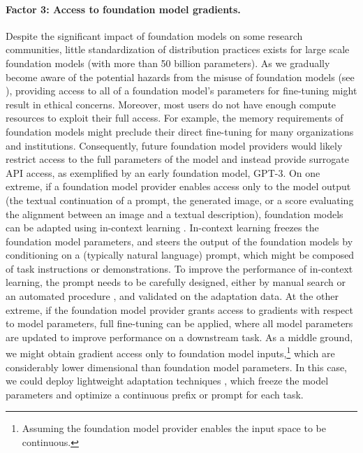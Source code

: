 \noindent\paragraph{Factor 3: Access to foundation model gradients.} 
Despite the significant impact of foundation models on some research communities, 
little standardization of distribution practices exists for large scale foundation models (with more than 50 billion parameters). 
As we gradually become aware of the potential hazards from the misuse of foundation models (see ), providing access to all of a foundation model's parameters for fine-tuning might result in ethical concerns. Moreover, most users do not have enough compute resources to exploit their full access. For example, the memory requirements of foundation models might preclude their direct fine-tuning for many organizations and institutions. Consequently, future foundation model providers would likely restrict access to the full parameters of the model and instead provide surrogate API access, as exemplified by an early foundation model, GPT-3. On one extreme, if a foundation model provider enables access only to the model output (\eg the textual continuation of a prompt, the generated image, or a score evaluating the alignment between an image and a textual description), foundation models can be adapted using in-context learning \citep{brown2020gpt3}. In-context learning freezes the foundation model parameters, and steers the output of the foundation models by conditioning on a (typically natural language) prompt, which might be composed of task instructions or demonstrations. To improve the performance of in-context learning, the prompt needs to be carefully designed, either by manual search or an automated procedure \citep{jiang-etal-2020-know, shin-etal-2020-autoprompt}, and validated on the adaptation data. At the other extreme, if the foundation model provider grants access to gradients with respect to model parameters, full fine-tuning can be applied, where all model parameters are updated to improve performance on a downstream task. As a middle ground, we might obtain gradient access only to foundation model inputs,\footnote{Assuming the foundation model provider enables the input space to be continuous.} which are considerably lower dimensional than foundation model parameters. In this case, we could deploy lightweight adaptation techniques  \citep{liu2021prompt, li2021prefix,lester2021power}, which freeze the model parameters and optimize a continuous prefix or prompt for each task.


